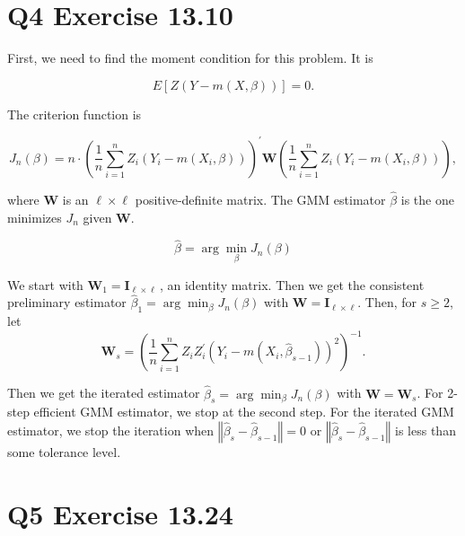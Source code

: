 \documentclass{article}
\begin{document}
\section*{Q4 Exercise 13.10}

First, we need to find the moment condition for this problem. It is

\begin{equation*}
E\left[ Z\left( Y-m\left( X,\beta \right) \right) \right] =0.
\end{equation*}

The criterion function is

\begin{equation*}
J_{n}\left( \beta \right) =n\cdot \left( \frac{1}{n}\sum_{i=1}^{n}Z_{i}%
\left( Y_{i}-m\left( X_{i},\beta \right) \right) \right) ^{\prime }\mathbf{W}%
\left( \frac{1}{n}\sum_{i=1}^{n}Z_{i}\left( Y_{i}-m\left( X_{i},\beta
\right) \right) \right) ,
\end{equation*}

where $\mathbf{W}$ is an $\ell \times \ell $ positive-definite matrix. The
GMM estimator $\hat{\beta}$ is the one minimizes $J_{n}$ given $\mathbf{W}$.

\begin{equation*}
\hat{\beta}=\arg \min_{\beta }J_{n}\left( \beta \right)
\end{equation*}

We start with $\mathbf{W}_{1}\mathbf{=I}_{\ell \times \ell }\,$, an identity
matrix. Then we get the consistent preliminary estimator $\hat{\beta}%
_{1}=\arg \min_{\beta }J_{n}\left( \beta \right) $ with $\mathbf{W=I}_{\ell
\times \ell }$. Then, for $s\geq 2$, let 
\begin{equation*}
\mathbf{W}_{s}=\left( \frac{1}{n}\sum_{i=1}^{n}Z_{i}Z_{i}^{\prime }\left(
Y_{i}-m\left( X_{i},\hat{\beta}_{s-1}\right) \right) ^{2}\right) ^{-1}.
\end{equation*}

Then we get the iterated estimator $\hat{\beta}_{s}=\arg \min_{\beta
}J_{n}\left( \beta \right) $ with $\mathbf{W=W}_{s}$. For 2-step efficient
GMM estimator, we stop at the second step. For the iterated GMM estimator,
we stop the iteration when $\left\Vert \hat{\beta}_{s}-\hat{\beta}%
_{s-1}\right\Vert =0$ or $\left\Vert \hat{\beta}_{s}-\hat{\beta}%
_{s-1}\right\Vert $ is less than some tolerance level.

\section*{Q5 Exercise 13.24}
\end{document}
